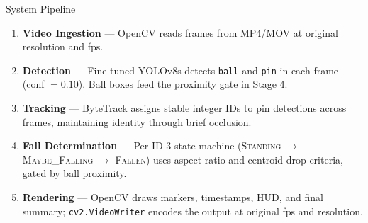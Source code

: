 \documentclass[aspectratio=169,10pt]{beamer}
\begin{document}
\begin{frame}{System Pipeline}
  \begin{enumerate}
    \item \textbf{Video Ingestion} --- OpenCV reads frames from MP4/MOV at original resolution and fps.
    \vspace{0.3em}
    \item \textbf{Detection} --- Fine-tuned YOLOv8s detects \texttt{ball} and \texttt{pin} in each frame (conf $= 0.10$). Ball boxes feed the proximity gate in Stage 4.
    \vspace{0.3em}
    \item \textbf{Tracking} --- ByteTrack assigns stable integer IDs to pin detections across frames, maintaining identity through brief occlusion.
    \vspace{0.3em}
    \item \textbf{Fall Determination} --- Per-ID 3-state machine (\textsc{Standing} $\to$ \textsc{Maybe\_Falling} $\to$ \textsc{Fallen}) uses aspect ratio and centroid-drop criteria, gated by ball proximity.
    \vspace{0.3em}
    \item \textbf{Rendering} --- OpenCV draws markers, timestamps, HUD, and final summary; \texttt{cv2.VideoWriter} encodes the output at original fps and resolution.
  \end{enumerate}
\end{frame}
\end{document}
